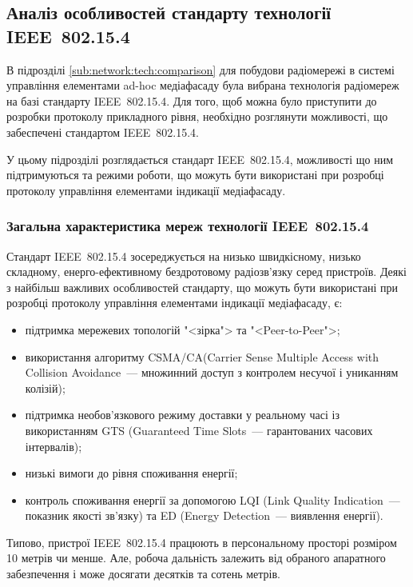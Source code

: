 \documentclass[a4paper,ukrainian,utf8,nocolumnsxix,floatsection,equationsection]{eskdtext}
\renewcommand\paragraph{\subsubsection}
\newcommand{\iee}[0]{IEEE~802.15.4\xspace}
\newcommand{\csma}[0]{CSMA/CA\xspace}
\newcommand{\engtxt}[1]{\foreignlanguage{english}{#1}}
\begin{document}

\subsection{Аналіз особливостей стандарту технології \iee}
\label{sub:ieee:standard:analysis}

В підрозділі \ref{sub:network:tech:comparison} для побудови радіомережі в системі управління елементами ad-hoc медіафасаду була вибрана технологія радіомереж на базі стандарту \iee. Для того, щоб можна було приступити до розробки протоколу прикладного рівня, необхідно розглянути можливості, що забеспечені стандартом \iee.

У цьому підрозділі розглядається стандарт \iee, можливості що ним підтримуються та режими роботи, що можуть бути використані при розробці протоколу управління елементами індикації медіафасаду. 

\paragraph{Загальна характеристика мереж технології \iee}
\label{par:ieee:standard}


Стандарт \iee зосереджується на низько швидкісному, низько складному, енерго-ефективному бездротовому радіозв’язку серед пристроїв. Деякі з найбільш важливих особливостей стандарту, що можуть бути використані при розробці протоколу управління елементами індикації медіафасаду, є:
\begin{itemize}
	\item підтримка мережевих топологій "<зірка"> та "<Peer-to-Peer">;
	\item використання алгоритму \csma (\engtxt{Carrier Sense Multiple Access with Collision Avoidance}~--- множинний доступ з контролем несучої і униканням колізій);
	\item підтримка необов’язкового режиму доставки у реальному часі із використанням GTS (Guaranteed Time Slots~--- гарантованих  часових інтервалів);
	\item низькі вимоги до рівня споживання енергії;
	\item контроль споживання енергії за допомогою LQI (Link Quality Indication~--- показник якості зв’язку) та ED (Energy Detection~--- виявлення енергії).
\end{itemize}

Типово, пристрої \iee працюють в персональному просторі розміром 10 метрів чи менше. Але, робоча дальність залежить від обраного апаратного забезпечення і може досягати десятків та сотень метрів.
\end{document}
